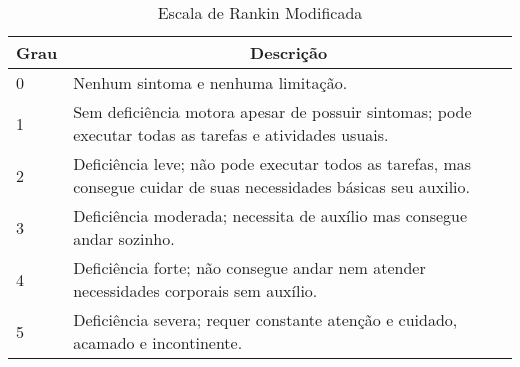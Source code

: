 	\begin{table}[H]
	\centering
	\caption{Escala de Rankin Modificada}
	\label{tab:rankin}
	\begin{tabularx}{\textwidth}{|l X|}
		
		\hline
		\multicolumn{1}{|c}{Grau} & \multicolumn{1}{c|}{Descrição}                                                                                                            \\ \hline
		0                          & Nenhum sintoma e nenhuma limitação.                                                                                                          \\ \hline
		1                          & Sem deficiência motora apesar de possuir sintomas; pode executar todas as tarefas e atividades usuais.                    \\ \hline
		2                          & Deficiência leve; não pode executar todos as tarefas, mas consegue cuidar de suas necessidades básicas seu auxilio.\\ \hline
		3                          & Deficiência moderada; necessita de auxílio mas consegue andar sozinho.\\ \hline
		4                          & Deficiência forte; não consegue andar nem atender necessidades corporais sem auxílio.\\ \hline
		5                          & Deficiência severa; requer constante atenção e cuidado, acamado e incontinente. \\ \hline
	\end{tabularx}
\end{table}
	
	
	
	